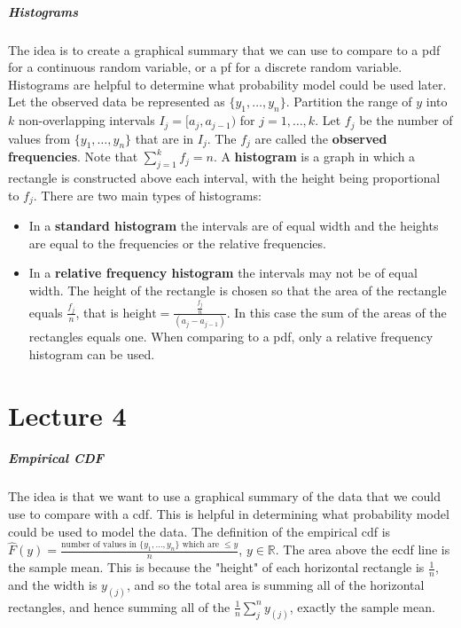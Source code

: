 \documentclass[10pt,letter]{article}
\theoremstyle{plain}
\theoremstyle{definition}
\begin{document}
\subparagraph{Histograms}
The idea is to create a graphical summary that we can use to compare to a pdf for a continuous random variable, or a pf for a discrete random variable. Histograms are helpful to determine what probability model could be used later. \\ 
Let the observed data be represented as $\{y_1,\ldots,y_n\}$. Partition the range of $y$ into $k$ non-overlapping intervals $I_j=[a_j,a_{j-1})$ for $j=1,\ldots,k$. Let $f_j$ be the number of values from $\{y_1,\ldots,y_n\}$ that are in $I_j$. The $f_j$ are called the \textbf{observed frequencies}. Note that $\sum_{j=1}^kf_j=n$. A \textbf{histogram} is a graph in which a rectangle is constructed above each interval, with the height being proportional to $f_j$. There are two main types of histograms: 
\begin{itemize}
    \item In a \textbf{standard histogram} the intervals are of equal width and the heights are equal to the frequencies or the relative frequencies. 
    \item In a \textbf{relative frequency histogram} the intervals may not be of equal width. The height of the rectangle is chosen so that the area of the rectangle equals $\frac{f_j}{n}$, that is $\text{height}=\frac{\frac{f_j}{n}}{(a_j-a_{j-1})}$. In this case the sum of the areas of the rectangles equals one. When comparing to a pdf, only a relative frequency histogram can be used. 
\end{itemize}




\section*{Lecture 4}
\subparagraph{Empirical CDF}
The idea is that we want to use a graphical summary of the data that we could use to compare with a cdf. This is helpful in determining what probability model could be used to model the data. The definition of the empirical cdf is $\hat{F}(y)=\frac{\text{number of values in }\{y_1,\ldots,y_n\}\text{ which are }\leq y}{n}$, $y\in\mathbb{R}$. The area above the ecdf line is the sample mean. This is because the "height" of each horizontal rectangle is $\frac{1}{n}$, and the width is $y_{(j)}$, and so the total area is summing all of the horizontal rectangles, and hence summing all of the $\frac{1}{n}\sum_{j}^ny_{(j)}$, exactly the sample mean.
\end{document}
